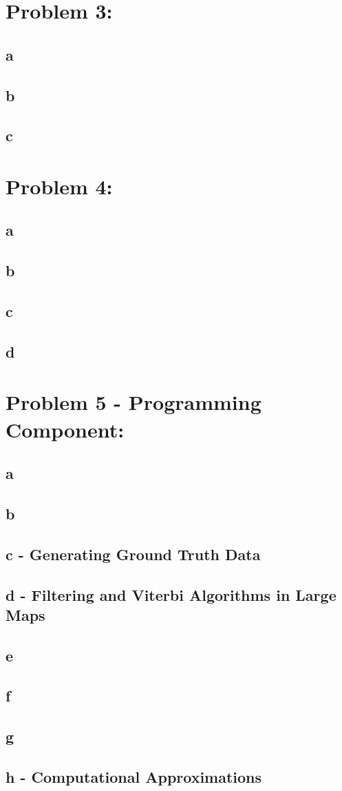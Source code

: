 \documentclass[11pt, oneside]{article}   	%
\begin{document}
\begin{flushleft}
\section*{Problem 3:}
\subsection*{a}
\subsection*{b}
\subsection*{c}
\section*{Problem 4:}
\subsection*{a}
\subsection*{b}
\subsection*{c}
\subsection*{d}
\section*{Problem 5 - Programming Component:}
\subsection*{a}
\subsection*{b}
\subsection*{c - Generating Ground Truth Data}
\subsection*{d - Filtering and Viterbi Algorithms in Large Maps}
\subsection*{e}
\subsection*{f}
\subsection*{g}
\subsection*{h - Computational Approximations}
\end{flushleft}
\end{document}
